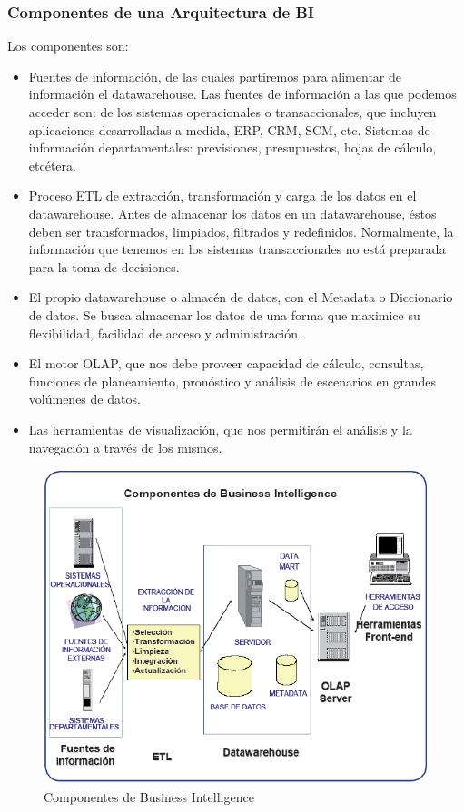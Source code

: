 \documentclass[preprint,12pt]{elsarticle}
\begin{document}
	\subsubsection{\textbf{Componentes de una Arquitectura de BI}}

	Los componentes son:

	\begin{itemize}
	\item Fuentes de información, de las cuales partiremos para alimentar de información el datawarehouse. Las fuentes de información a las que podemos acceder son: de los sistemas operacionales o transaccionales, que incluyen aplicaciones desarrolladas a medida, ERP, CRM, SCM, etc. Sistemas de información departamentales: previsiones, presupuestos, hojas de cálculo, etcétera.
	\item Proceso ETL de extracción, transformación y carga de los datos en el datawarehouse. Antes de almacenar los datos en un datawarehouse, éstos deben ser transformados, limpiados, filtrados y redefinidos. Normalmente, la información que tenemos en los sistemas transaccionales no está preparada para la toma de decisiones.
	\item El propio datawarehouse o almacén de datos, con el Metadata o Diccionario de datos. Se busca almacenar los datos de una forma que maximice su flexibilidad, facilidad de acceso y administración.
	\item El motor OLAP, que nos debe proveer capacidad de cálculo, consultas, funciones de planeamiento, pronóstico y análisis de escenarios en grandes volúmenes de datos.
	\item Las herramientas de visualización, que nos permitirán el análisis y la navegación a través de los mismos. \cite{referenciaestrella3}

	\end{itemize}

\begin{figure}[htb]
	\begin{center}
		\includegraphics[width=14cm]{./IMAGENES/componentes} 
		\caption{Componentes de Business Intelligence}
	\end{center}
\end{figure}
\end{document}
